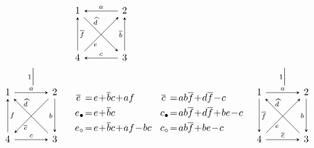 \documentclass[11pt, letterpaper]{amsart}
\theoremstyle{definition}
\numberwithin{equation}{section}
\newcommand{\vmutation}[1]{  {\scriptstyle #1}{\Bigl|\Bigr.}  }
\begin{document}
\begin{figure}[ht]
\begin{equation*}
\begin{array}{ccccccccc}
&  
\begin{tikzcd}[arrows={-stealth}, sep=\sepps]
  1  \arrow[r,  "a", \snsl] \arrow[dr, "\widehat{d}" near start, outer sep=\outsepd, \snls]  \arrow[d, "\overline{f}", \snsl]  
  & 2  \arrow[d, swap, "\overline{b}", stealth-] \arrow[dl, "e", near end, outer sep=\outsepe, \snsl]
  \\
   4 
   & 3  \arrow[l, "c", swap, \snls] 
\end{tikzcd}
 & \\
 
 \\[-8pt]
\vmutation{1}   & 
\multicolumn{5}{c}{\begin{aligned}  \end{aligned} }& 
\vmutation{1}\\


\begin{tikzcd}[arrows={-stealth}, sep=\sepps]
  1  \arrow[r,  "a", \snls] \arrow[dr, "\widehat{d}" near start, outer sep=\outsepd, \snsl]  \arrow[d, "f", \snsl]  
  & 2  \arrow[d, swap, "b", \snls] \arrow[dl, "\overline e", near end, outer sep=\outsepe, \snls]
  \\
   4 
   & 3  \arrow[l, "c", swap, \snsl] 
\end{tikzcd}
 &\multicolumn{2}{c}{
 \begin{aligned}
 \overline e \,\,&\!=\! e \!+\! \overline{b} c \!+ \!af\\
 e_\bullet &\!=\!e\!+\!\overline{b} c\\
 e_\circ &\!=\! e \!+\! \overline{b} c \!+\! af \!-\!bc %
 \end{aligned}
 \hspace{-15pt}
 }
& &\multicolumn{2}{c}{
 \begin{aligned}
 \overline c \,\,&\!= \!ab\overline{f}\! +\!d\overline{f}\!-\! c \\ %
 c_\bullet &\!= \!ab\overline{f}\! +\!d\overline{f}\!+\!be \!-\! c \\
 c_\circ &\!= \!ab\overline{f}\!+\!be \!-\! c \\%
 \end{aligned}
 }
 
&  
\begin{tikzcd}[arrows={-stealth}, sep=\sepps]
  1  \arrow[r,  "a", \snls] \arrow[dr, "\widehat{d}" near start, outer sep=\outsepd, \snsl]  \arrow[d, "\overline{f}", \snls]  
  & 2  \arrow[d, swap, "b", \snls] \arrow[dl, "e", near end, outer sep=\outsepe, \snsl]
  \\
   4 
   & 3  \arrow[l, "\overline c",  swap, \snsl] 
\end{tikzcd}


\end{array}
\end{equation*}
\end{figure}
\end{document}
